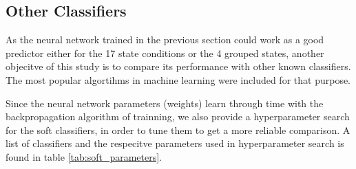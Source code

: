 \documentclass[twocolumn]{article}
\begin{document}

\subsection{Other Classifiers}

As the neural network trained in the previous section could work as a good predictor either for the 17 state conditions or the 4 grouped states, another objecitve of this study is to compare its performance with other known classifiers. The most popular algortihms in machine learning were included for that purpose.

Since the neural network parameters (weights) learn through time with the backpropagation algorithm of trainning, we also provide a hyperparameter search for the soft classifiers, in order to tune them to get a more reliable comparison. A list of classifiers and the respecitve parameters used in hyperparameter search is found in table \ref*{tab:soft_parameters}.
\end{document}
